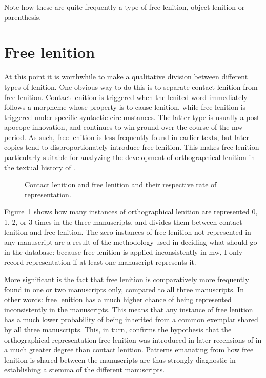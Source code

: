 Note how these are quite frequently a type of free lenition, \eg object lenition or parenthesis. 

\section{Free lenition}
\label{sec:points-where-one}
At this point it is worthwhile to make a qualitative division between different types of lenition. One obvious way to do this is to separate contact lenition from free lenition. Contact lenition is triggered when the lenited word immediately follows a morpheme whose property is to cause lenition, while free lenition is triggered under specific syntactic circumstances. The latter type is usually a post-apocope innovation, and continues to win ground over the course of the \gls{mw} period. As such, free lenition is less frequently found in earlier texts, but later copies tend to disproportionately introduce free lenition. This makes free lenition particularly suitable for analyzing the development of orthographical lenition in the textual history of .


\begin{figure}[h]
  \centering
  
  \caption{Contact lenition and free lenition and their respective rate of representation.}
  \label{fig:contfreelendewi}
\end{figure}

Figure~\ref{fig:contfreelendewi} shows how many instances of orthographical lenition are represented 0, 1, 2, or 3 times in the three manuscripts, and divides them between contact lenition and free lenition. The zero instances of free lenition not represented in any manuscript are a result of the methodology used in deciding what should go in the database: because free lenition is applied inconsistently in \gls{mw}, I only record representation if at least one manuscript represents it.

More significant is the fact that free lenition is comparatively more frequently found in one or two manuscripts only, compared to all three manuscripts. In other words: free lenition has a much higher chance of being represented inconsistently in the manuscripts. This means that any instance of free lenition has a much lower probability of being inherited from a common exemplar shared by all three manuscripts. This, in turn, confirms the hypothesis that the orthographical representation free lenition was introduced in later recensions of  in a much greater degree than contact lenition. Patterns  emanating from how free lenition is shared between the manuscripts are thus strongly diagnostic in establishing a stemma of the different manuscripts.

